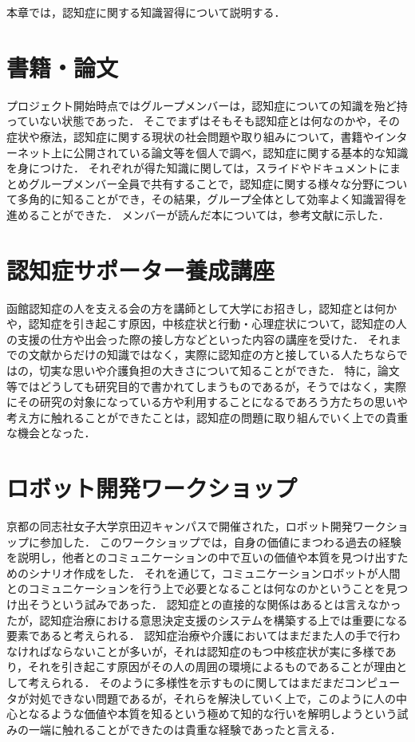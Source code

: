 \documentclass[../report]{subfiles}
\begin{document}
本章では，認知症に関する知識習得について説明する．

\section{書籍・論文}
プロジェクト開始時点ではグループメンバーは，認知症についての知識を殆ど持っていない状態であった．
そこでまずはそもそも認知症とは何なのかや，その症状や療法，認知症に関する現状の社会問題や取り組みについて，書籍やインターネット上に公開されている論文等を個人で調べ，認知症に関する基本的な知識を身につけた．
それぞれが得た知識に関しては，スライドやドキュメントにまとめグループメンバー全員で共有することで，認知症に関する様々な分野について多角的に知ることができ，その結果，グループ全体として効率よく知識習得を進めることができた．
メンバーが読んだ本については，参考文献に示した．

\section{認知症サポーター養成講座}
函館認知症の人を支える会の方を講師として大学にお招きし，認知症とは何かや，認知症を引き起こす原因，中核症状と行動・心理症状について，認知症の人の支援の仕方や出会った際の接し方などといった内容の講座を受けた．
それまでの文献からだけの知識ではなく，実際に認知症の方と接している人たちならではの，切実な思いや介護負担の大きさについて知ることができた．
特に，論文等ではどうしても研究目的で書かれてしまうものであるが，そうではなく，実際にその研究の対象になっている方や利用することになるであろう方たちの思いや考え方に触れることができたことは，認知症の問題に取り組んでいく上での貴重な機会となった．

\section{ロボット開発ワークショップ}
京都の同志社女子大学京田辺キャンパスで開催された，ロボット開発ワークショップに参加した．
このワークショップでは，自身の価値にまつわる過去の経験を説明し，他者とのコミュニケーションの中で互いの価値や本質を見つけ出すためのシナリオ作成をした．
それを通じて，コミュニケーションロボットが人間とのコミュニケーションを行う上で必要となることは何なのかということを見つけ出そうという試みであった．
認知症との直接的な関係はあるとは言えなかったが，認知症治療における意思決定支援のシステムを構築する上では重要になる要素であると考えられる．
認知症治療や介護においてはまだまた人の手で行わなければならないことが多いが，それは認知症のもつ中核症状が実に多様であり，それを引き起こす原因がその人の周囲の環境によるものであることが理由として考えられる．
そのように多様性を示すものに関してはまだまだコンピュータが対処できない問題であるが，それらを解決していく上で，このように人の中心となるような価値や本質を知るという極めて知的な行いを解明しようという試みの一端に触れることができたのは貴重な経験であったと言える．
\end{document}
